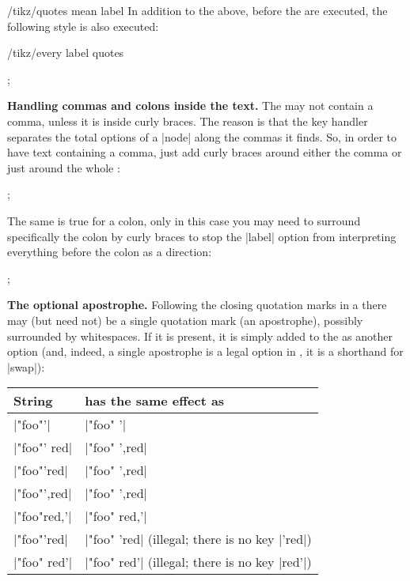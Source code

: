\begin{key}{/tikz/quotes mean label}
    In addition to the above, before the  are executed, the
    following style is also executed:
    \begin{stylekey}{/tikz/every label quotes}
\begin{codeexample}[preamble={\usetikzlibrary{quotes}}]
\tikz [every label quotes/.style=red]
  ;
\end{codeexample}
    \end{stylekey}

    \medskip
    \noindent\textbf{Handling commas and colons inside the text.}
    The  may not contain a comma, unless it is inside curly braces.
    The reason is that the key handler separates the total options of a |node|
    along the commas it finds. So, in order to have text containing a comma,
    just add curly braces around either the comma or just around the whole
    :
\begin{codeexample}[preamble={\usetikzlibrary{quotes}}]
\tikz {};
\end{codeexample}
    The same is true for a colon, only in this case you may need to surround
    specifically the colon by curly braces to stop the |label| option from
    interpreting everything before the colon as a direction:
\begin{codeexample}[preamble={\usetikzlibrary{quotes}}]
\tikz {};
\end{codeexample}

    \medskip
    \noindent\textbf{The optional apostrophe.}
    Following the closing quotation marks in a  there may (but
    need not) be a single quotation mark (an apostrophe), possibly surrounded
    by whitespaces. If it is present, it is simply added to the 
    as another option (and, indeed, a single apostrophe is a legal option in
    \tikzname, it is a shorthand for |swap|):

    \begin{tabular}{ll}
        String         & has the same effect as \\\hline
        |"foo"'|       & |"foo" {'}| \\
        |"foo"' red|   & |"foo" {',red}| \\
        |"foo"'{red}|  & |"foo" {',red}| \\
        |"foo"{',red}| & |"foo" {',red}| \\
        |"foo"{red,'}| & |"foo" {red,'}| \\
        |"foo"{'red}|  & |"foo" {'red}| (illegal; there is no key |'red|)\\
        |"foo" red'|   & |"foo" {red'}| (illegal; there is no key |red'|)\\
    \end{tabular}
\end{key}

